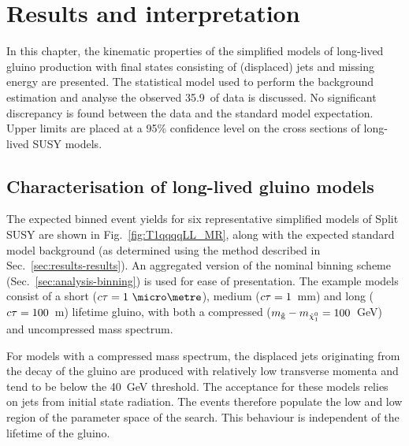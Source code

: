 \chapter{Results and interpretation}
\label{chap:results}



In this chapter, the kinematic properties of the simplified models of 
long-lived gluino production with final states consisting of (displaced) jets 
and missing energy are presented. The statistical model used to perform the 
background estimation and analyse the observed 35.9~\ifb of data is discussed. 
No significant discrepancy is found between the data and the standard model 
expectation. Upper limits are placed at a 95\% confidence level on the cross 
sections of long-lived SUSY models. 


\section{Characterisation of long-lived gluino models}

The expected binned event yields for six representative simplified models of 
Split SUSY are shown in Fig.~\ref{fig:T1qqqqLL_MR}, along with the expected 
standard model background (as determined using the method described in 
Sec.~\ref{sec:results-results}). An aggregated version of the nominal binning 
scheme (Sec.~\ref{sec:analysis-binning}) is used for ease of presentation. The 
example models consist of a short ($\ctau=1~\micro\metre$), medium 
($c\tau=1$~mm) and long ($c\tau=100$~m) lifetime gluino, with both a compressed 
($m_{\mathrm{\tilde{g}}} - m_{\tilde{\chi}_1^0} = 100$~GeV) and uncompressed mass spectrum.

For models with a compressed mass spectrum, the displaced jets originating from 
the decay of the gluino are produced with relatively low transverse momenta and 
tend to be below the 40~GeV threshold. The acceptance for these models relies 
on jets from initial state radiation. The events therefore populate the low 
\njet and low \scalht region of the parameter space of the search. This 
behaviour is independent of the lifetime of the gluino.


